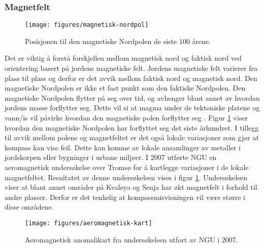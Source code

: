 \subsubsection{Magnetfelt}

\begin{figure}[htp]
\centering
\texttt{[image: figures/magnetisk-nordpol]}
\caption{Posisjonen til den magnetiske Nordpolen de siste 100 årene. \parencite{IncEncyclopediaBritannica}}
\label{fig:magnetisk-nordpol}
\end{figure}

Det er viktig å forstå forskjellen mellom magnetisk nord og faktisk nord ved orientering basert på jordens magnetiske felt. 
Jordens magnetiske felt varierer fra plass til plass og derfor er det avvik mellom faktisk nord og magnetisk nord. 
Den magnetiske Nordpolen er ikke et fast punkt som den faktiske Nordpolen. Den magnetiske Nordpolen flytter på seg over tid, 
og avhenger blant annet av hvordan jordens masse forflytter seg. Dette vil si at magma under de tektoniske platene og 
vann/is vil påvirke hvordan den magnetiske polen forflytter seg . Figur \ref{fig:magnetisk-nordpol} viser hvordan 
den magnetiske Nordpolen har forflyttet seg det siste århundret. 
I tillegg til avvik mellom polene og magnetfeltet er det også lokale variasjoner som gjør at kompass kan vise feil. 
Dette kan komme av lokale ansamlinger av metaller i jordskorpen eller bygninger i urbane miljøer. 
I 2007 utførte NGU en aeromagnetisk undersøkelse over Tromsø for å kartlegge variasjoner i de lokale magnetfeltet. 
Resultatet av denne undersøkelsen vises i figur \ref{fig:magnetisk-nordpol}. Undersøkelsen viser at blant annet områder på Kvaløya og 
Senja har økt magnetfelt i forhold til andre plasser. Derfor er det tenkelig at kompassmisvisningen vil være større i disse områdene. 
\parencite{Kartverket} 

\begin{figure}[htp]
\centering
\texttt{[image: figures/aeromagnetisk-kart]}
\caption{Aeromagnetisk anomalikart fra undersøkelsen utført av NGU i 2007. \parencite{Gellein2007}}
\label{fig:aeromagnetisk-kart}
\end{figure}